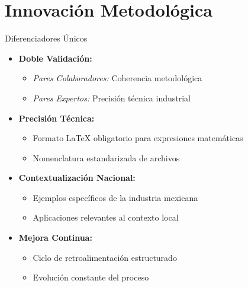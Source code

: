 \documentclass[10pt,aspectratio=169]{beamer}
\begin{document}
	
	\section{Innovación Metodológica}
	
	\begin{frame}{Diferenciadores Únicos}
		\begin{itemize}
			\item \textbf{Doble Validación:}
			\begin{itemize}
				\item \textit{Pares Colaboradores:} Coherencia metodológica
				\item \textit{Pares Expertos:} Precisión técnica industrial
			\end{itemize}
			
			\vspace{0.3cm}
			
			\item \textbf{Precisión Técnica:}
			\begin{itemize}
				\item Formato LaTeX obligatorio para expresiones matemáticas
				\item Nomenclatura estandarizada de archivos
			\end{itemize}
			
			\vspace{0.3cm}
			
			\item \textbf{Contextualización Nacional:}
			\begin{itemize}
				\item Ejemplos específicos de la industria mexicana
				\item Aplicaciones relevantes al contexto local
			\end{itemize}
			
			\vspace{0.3cm}
			
			\item \textbf{Mejora Continua:}
			\begin{itemize}
				\item Ciclo de retroalimentación estructurado
				\item Evolución constante del proceso
			\end{itemize}
		\end{itemize}
	\end{frame}
	
\end{document}
